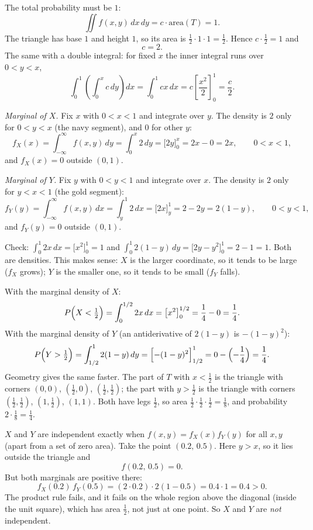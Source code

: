 \begin{solution}
	 The total probability must be $1$:
	\[ \iint f(x,y)\,dx\,dy=c\cdot\text{area}(T)=1. \]
	The triangle has base $1$ and height $1$, so its area is
	$\frac12\cdot1\cdot1=\frac12$. Hence $c\cdot\frac12=1$ and
	\[ c=2. \]
	The same with a double integral: for fixed $x$ the inner integral runs over
	$0<y<x$,
	\[
		\int_0^1\!\left(\int_0^x c\,dy\right)dx=\int_0^1 cx\,dx
		=c\left[\frac{x^2}{2}\right]_0^1=\frac c2 .
	\]

	 \emph{Marginal of $X$.} Fix $x$ with $0<x<1$ and integrate over
	$y$. The density is $2$ only for $0<y<x$ (the navy segment), and $0$ for
	other $y$:
	\[
		f_X(x)=\int_{-\infty}^{\infty}f(x,y)\,dy=\int_0^x 2\,dy
		=\bigl[2y\bigr]_0^x=2x-0=2x,\qquad 0<x<1,
	\]
	and $f_X(x)=0$ outside $(0,1)$.

	\emph{Marginal of $Y$.} Fix $y$ with $0<y<1$ and integrate over $x$. The
	density is $2$ only for $y<x<1$ (the gold segment):
	\[
		f_Y(y)=\int_{-\infty}^{\infty}f(x,y)\,dx=\int_y^1 2\,dx
		=\bigl[2x\bigr]_y^1=2-2y=2(1-y),\qquad 0<y<1,
	\]
	and $f_Y(y)=0$ outside $(0,1)$.

	Check: $\int_0^1 2x\,dx=\bigl[x^2\bigr]_0^1=1$ and
	$\int_0^1 2(1-y)\,dy=\bigl[2y-y^2\bigr]_0^1=2-1=1$. Both are densities.
	This makes sense: $X$ is the larger coordinate, so it tends to be large
	($f_X$ grows); $Y$ is the smaller one, so it tends to be small ($f_Y$
	falls).

	 With the marginal density of $X$:
	\[
		P\Bigl(X<\tfrac12\Bigr)=\int_0^{1/2}2x\,dx=\bigl[x^2\bigr]_0^{1/2}
		=\frac14-0=\frac14 .
	\]
	With the marginal density of $Y$ (an antiderivative of $2(1-y)$ is
	$-(1-y)^2$):
	\[
		P\Bigl(Y>\tfrac12\Bigr)=\int_{1/2}^{1}2(1-y)\,dy
		=\Bigl[-(1-y)^2\Bigr]_{1/2}^{1}=0-\Bigl(-\frac14\Bigr)=\frac14 .
	\]
	Geometry gives the same faster. The part of $T$ with $x<\frac12$ is the
	triangle with corners $(0,0)$, $(\frac12,0)$, $(\frac12,\frac12)$; the part
	with $y>\frac12$ is the triangle with corners $(\frac12,\frac12)$,
	$(1,\frac12)$, $(1,1)$. Both have legs $\frac12$, so area
	$\frac12\cdot\frac12\cdot\frac12=\frac18$, and probability
	$2\cdot\frac18=\frac14$.

	 $X$ and $Y$ are independent exactly when
	$f(x,y)=f_X(x)f_Y(y)$ for all $x,y$ (apart from a set of zero area). Take
	the point $(0.2,\,0.5)$. Here $y>x$, so it lies outside the triangle and
	\[ f(0.2,\,0.5)=0. \]
	But both marginals are positive there:
	\[ f_X(0.2)\,f_Y(0.5)=(2\cdot0.2)\cdot2(1-0.5)=0.4\cdot1=0.4>0. \]
	The product rule fails, and it fails on the whole region above the
	diagonal (inside the unit square), which has area $\frac12$, not just at one
	point. So $X$ and $Y$ are \emph{not} independent.


\end{solution}
